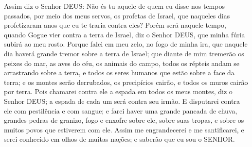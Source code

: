 {  Assim diz o Senhor DEUS: Não és tu aquele de quem eu disse nos tempos passados, por meio dos meus servos, os profetas de Israel, que naqueles dias profetizaram
{} anos que eu te traria contra eles?
  Porém será naquele tempo, quando Gogue vier contra a terra de Israel, diz o Senhor DEUS, que minha fúria subirá ao meu rosto.
  Porque falei em meu zelo, no fogo de minha ira, que naquele dia haverá grande tremor sobre a terra de Israel;
   que diante de mim tremerão os peixes do mar, as aves do céu, os animais do campo, todos os répteis andam se arrastrando sobre a terra, e todos os seres humanos que estão sobre a face da terra; e os montes serão derrubados, os precipícios cairão, e todos os muros cairão por terra.
  Pois chamarei contra ele a espada em todos os meus montes, diz o Senhor DEUS; a espada de cada um será contra seu irmão.
  E disputarei contra ele com pestilência e com sangue; e farei haver uma grande pancada de chuva, grandes pedras de granizo, fogo e enxofre sobre ele, sobre suas tropas, e sobre os muitos povos que estiverem com ele.
  Assim me engrandecerei e me santificarei, e serei conhecido em olhos de muitas nações; e saberão que eu sou o SENHOR.
\par }

